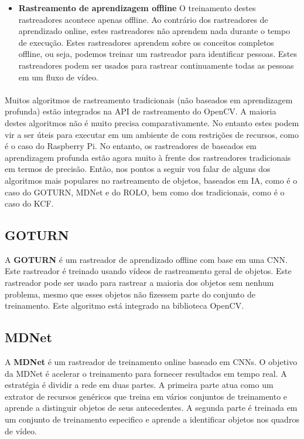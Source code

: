 \begin{itemize}
    \item \textbf{Rastreamento de aprendizagem offline}
    \newline O treinamento destes rastreadores acontece apenas offline. Ao contrário dos rastreadores de aprendizado online, estes rastreadores não aprendem nada durante o tempo de execução. Estes rastreadores aprendem sobre os conceitos completos offline, ou seja, podemos treinar um rastreador para identificar pessoas. Estes rastreadores podem ser usados para rastrear continuamente todas as pessoas em um fluxo de vídeo.
\end{itemize}

\paragraph{}
Muitos algoritmos de rastreamento tradicionais (não baseados em aprendizagem profunda) estão integrados na \ac{API} de rastreamento do \ac{OpenCV}. A maioria destes algoritmos não é muito precisa comparativamente. No entanto estes podem vir a ser úteis para executar em um ambiente de com restrições de recursos, como é o caso do Raspberry Pi. No entanto, os rastreadores de baseados em aprendizagem profunda estão agora muito à frente dos rastreadores tradicionais em termos de precisão. Então, nos pontos a seguir vou falar de alguns dos algoritmos mais populares no rastreamento de objetos, baseados em \ac{IA}, como é o caso do \ac{GOTURN}, \ac{MDNet} e do \ac{ROLO}, bem como dos tradicionais, como é o caso do \ac{KCF}.

\subsection{GOTURN}
\label{chap2:subsec:goturn}

A \textbf{\ac{GOTURN}} é um rastreador de aprendizado offline com base em uma \ac{CNN}. Este rastreador é treinado usando vídeos de rastreamento geral de objetos. Este rastreador pode ser usado para rastrear a maioria dos objetos sem nenhum problema, mesmo que esses objetos não fizessem parte do conjunto de treinamento.
\newline Este algoritmo está integrado na biblioteca \ac{OpenCV}.

\subsection{MDNet}
\label{chap2:subsec:mdnet}

A \textbf{\ac{MDNet}} é um rastreador de treinamento online baseado em \ac{CNN}s. O objetivo da \ac{MDNet} é acelerar o treinamento para fornecer resultados em tempo real. A estratégia é dividir a rede em duas partes. A primeira parte atua como um extrator de recursos genéricos que treina em vários conjuntos de treinamento e aprende a distinguir objetos de seus antecedentes. A segunda parte é treinada em um conjunto de treinamento especifico e aprende a identificar objetos nos quadros de vídeo.

